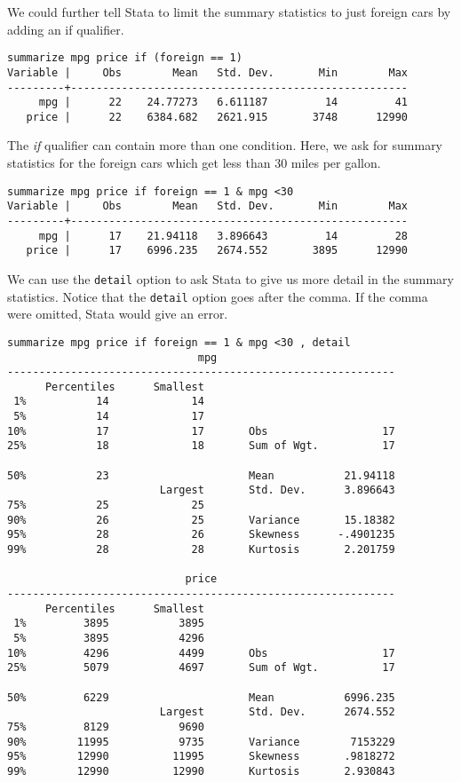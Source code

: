 We could further tell Stata to limit the summary statistics to just foreign cars by adding an if qualifier.

\begin{lstlisting}
summarize mpg price if (foreign == 1)
Variable |     Obs        Mean   Std. Dev.       Min        Max
---------+-----------------------------------------------------
     mpg |      22    24.77273   6.611187         14         41
   price |      22    6384.682   2621.915       3748      12990
\end{lstlisting}

The \textit{if} qualifier can contain more than one condition. Here, we ask for summary statistics for the foreign cars which get less than 30 miles per gallon.

\begin{lstlisting}
summarize mpg price if foreign == 1 & mpg <30
Variable |     Obs        Mean   Std. Dev.       Min        Max
---------+-----------------------------------------------------
     mpg |      17    21.94118   3.896643         14         28
   price |      17    6996.235   2674.552       3895      12990
\end{lstlisting}

We can use the \lstinline{detail} option to ask Stata to give us more detail in the summary statistics. Notice that the \lstinline{detail} option goes after the comma. If the comma were omitted, Stata would give an error.

\begin{lstlisting}
summarize mpg price if foreign == 1 & mpg <30 , detail
                              mpg
-------------------------------------------------------------
      Percentiles      Smallest
 1%           14             14
 5%           14             17
10%           17             17       Obs                  17
25%           18             18       Sum of Wgt.          17

50%           23                      Mean           21.94118
                        Largest       Std. Dev.      3.896643
75%           25             25
90%           26             25       Variance       15.18382
95%           28             26       Skewness      -.4901235
99%           28             28       Kurtosis       2.201759

                            price
-------------------------------------------------------------
      Percentiles      Smallest
 1%         3895           3895
 5%         3895           4296
10%         4296           4499       Obs                  17
25%         5079           4697       Sum of Wgt.          17

50%         6229                      Mean           6996.235
                        Largest       Std. Dev.      2674.552
75%         8129           9690
90%        11995           9735       Variance        7153229
95%        12990          11995       Skewness       .9818272
99%        12990          12990       Kurtosis       2.930843
\end{lstlisting}


